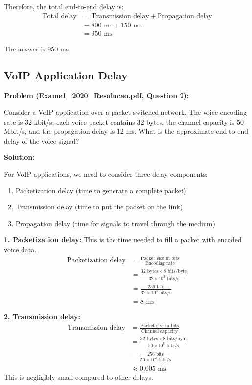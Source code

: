 \documentclass[11pt,a4paper]{article}
\begin{document}
Therefore, the total end-to-end delay is:
\begin{align}
    \text{Total delay} &= \text{Transmission delay} + \text{Propagation delay}\\
    &= 800 \text{ ms} + 150 \text{ ms}\\
    &= 950 \text{ ms}
\end{align}

The answer is 950 ms.

\subsection{VoIP Application Delay}
\textbf{Problem (Exame1\_2020\_Resolucao.pdf, Question 2):}

Consider a VoIP application over a packet-switched network. The voice encoding rate is 32 kbit/s, each voice packet contains 32 bytes, the channel capacity is 50 Mbit/s, and the propagation delay is 12 ms. What is the approximate end-to-end delay of the voice signal?

\textbf{Solution:}

For VoIP applications, we need to consider three delay components:
\begin{enumerate}
    \item Packetization delay (time to generate a complete packet)
    \item Transmission delay (time to put the packet on the link)
    \item Propagation delay (time for signals to travel through the medium)
\end{enumerate}

\textbf{1. Packetization delay:}
This is the time needed to fill a packet with encoded voice data.
\begin{align}
    \text{Packetization delay} &= \frac{\text{Packet size in bits}}{\text{Encoding rate}}\\
    &= \frac{32 \text{ bytes} \times 8 \text{ bits/byte}}{32 \times 10^3 \text{ bits/s}}\\
    &= \frac{256 \text{ bits}}{32 \times 10^3 \text{ bits/s}}\\
    &= 8 \text{ ms}
\end{align}

\textbf{2. Transmission delay:}
\begin{align}
    \text{Transmission delay} &= \frac{\text{Packet size in bits}}{\text{Channel capacity}}\\
    &= \frac{32 \text{ bytes} \times 8 \text{ bits/byte}}{50 \times 10^6 \text{ bits/s}}\\
    &= \frac{256 \text{ bits}}{50 \times 10^6 \text{ bits/s}}\\
    &\approx 0.005 \text{ ms}
\end{align}
This is negligibly small compared to other delays.
\end{document}
